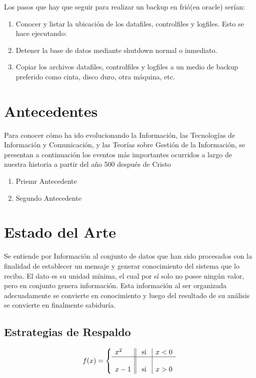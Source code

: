 Los pasos que hay que seguir para realizar un backup en frió(en oracle) serían:

\begin{enumerate}
\item Conocer y listar la ubicación de los datafiles, controlfiles y logfiles. Esto se hace ejecutando:
\item Detener la base de datos mediante shutdown normal o inmediato.
\item Copiar los archivos datafiles, controlfiles y logfiles a un medio de backup preferido como cinta, disco duro, otra máquina, etc.
\end{enumerate}

\section{Antecedentes}
Para conocer cómo ha ido evolucionando la Información, las Tecnologías de Información y Comunicación, y las Teorías sobre Gestión de la Información, se presentan a continuación los eventos m\'as importantes ocurridos a largo de nuestra historia a partir del año 500 después de Cristo

\begin{enumerate}
\item Priemr Antecedente
\item Segundo Antecedente
\end{enumerate}

\section{Estado del Arte}
Se entiende por Información al conjunto de datos que han sido procesados con la finalidad de establecer un mensaje y generar conocimiento del sistema que lo reciba. El dato es su unidad mínima, el cual por sí solo no posee ningún valor, pero en conjunto genera información. Esta información al ser organizada adecuadamente se convierte en conocimiento y luego del resultado de su análisis se convierte en finalmente sabiduría. 

\subsection{Estrategias de Respaldo}

\begin{equation}
f(x)= \left\{ \begin{array}{l||c|l}
x^2 & \mbox{ si } & x<0 \\ \hline
& & \\
x-1 & \mbox{ si } & x>0
\end{array}
\right.	
\end{equation}

